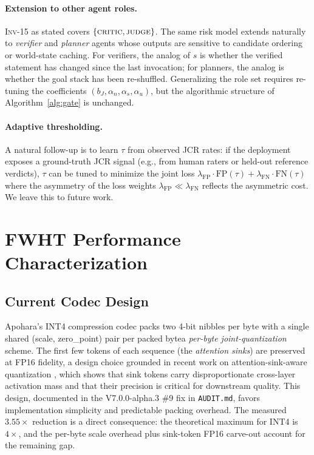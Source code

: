 \documentclass[10pt,twocolumn]{article}
\newcommand{\INV}[1]{\textsc{Inv-#1}}
\newcommand{\Shuf}{s}
\begin{document}
\paragraph{Extension to other agent roles.}
\INV{15} as stated covers $\{\textsc{critic}, \textsc{judge}\}$. The same
risk model extends naturally to \emph{verifier} and \emph{planner} agents
whose outputs are sensitive to candidate ordering or world-state caching.
For verifiers, the analog of $\Shuf$ is whether the verified statement
has changed since the last invocation; for planners, the analog is whether
the goal stack has been re-shuffled. Generalizing the role set requires
re-tuning the coefficients $(b_J, \alpha_n, \alpha_s, \alpha_u)$, but the
algorithmic structure of Algorithm~\ref{alg:gate} is unchanged.

\paragraph{Adaptive thresholding.}
A natural follow-up is to learn $\tau$ from observed JCR rates: if the
deployment exposes a ground-truth JCR signal (e.g., from human raters or
held-out reference verdicts), $\tau$ can be tuned to minimize the
joint loss
$\lambda_{\mathrm{FP}}\cdot \mathrm{FP}(\tau) +
 \lambda_{\mathrm{FN}}\cdot \mathrm{FN}(\tau)$
where the asymmetry of the loss weights $\lambda_{\mathrm{FP}} \ll
\lambda_{\mathrm{FN}}$ reflects the asymmetric cost. We leave this to
future work.

\section{FWHT Performance Characterization}
\label{sec:fwht}

\subsection{Current Codec Design}
\label{sec:fwht:design}

Apohara's INT4 compression codec packs two 4-bit nibbles per byte with a
single shared (scale, zero\_point) pair per packed byte\textemdash a
\emph{per-byte joint-quantization} scheme. The first few tokens of each
sequence (the \emph{attention sinks}) are preserved at FP16 fidelity, a
design choice grounded in recent work on attention-sink-aware
quantization \cite{kvsink}, which shows that sink tokens carry
disproportionate cross-layer activation mass and that their precision is
critical for downstream quality. This design, documented in the
V7.0.0-alpha.3 \#9 fix in \texttt{AUDIT.md}, favors implementation
simplicity and predictable packing overhead. The measured $3.55\times$
reduction is a direct consequence: the theoretical maximum for INT4 is
$4\times$, and the per-byte scale overhead plus sink-token FP16 carve-out
account for the remaining gap.
\end{document}
